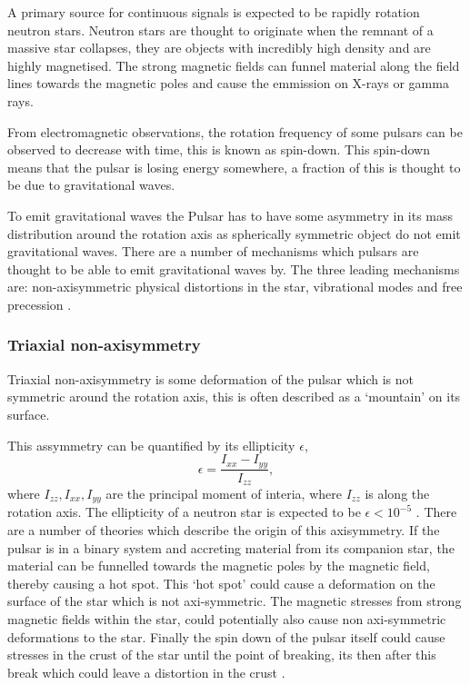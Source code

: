 A primary source for continuous signals is expected to be rapidly rotation neutron stars.
Neutron stars are thought to originate when the remnant of a massive star collapses, they are objects with incredibly high density and are highly magnetised.
The strong magnetic fields can funnel material along the field lines towards the magnetic poles and cause the emmission on X-rays or gamma rays.


From electromagnetic observations, the rotation frequency of some pulsars can be observed to decrease with time, this is known as spin-down.
This spin-down means that the pulsar is losing energy somewhere, a fraction of this is thought to be due to gravitational waves. 

To emit gravitational waves the Pulsar has to have some asymmetry in its mass distribution around the rotation axis as spherically symmetric object do not emit gravitational waves.
There are a number of mechanisms which pulsars are thought to be able to emit gravitational waves by. The three leading mechanisms are: non-axisymmetric physical distortions in the star, vibrational modes and free precession \citep{Becker2009}.

\subsubsection{Triaxial non-axisymmetry}

Triaxial non-axisymmetry is some deformation of the pulsar which is not symmetric around the rotation axis, this is often described as a `mountain' on its surface.

This assymmetry can be quantified by its ellipticity $\epsilon$,
\begin{equation}
\label{ellipticity}
\epsilon = \frac{I_{xx}-I_{yy}}{I_{zz}},
\end{equation}
where $I_{zz},I_{xx},I_{yy}$ are the principal moment of interia, where $I_{zz}$ is along the rotation axis. 
The ellipticity of a neutron star is expected to be $ \epsilon<10^{-5}$ \citep{Becker2009}. 
There are a number of theories which describe the origin of this axisymmetry.
If the pulsar is in a binary system and accreting material from its companion star, the material can be funnelled towards the magnetic poles by the magnetic field, thereby causing a hot spot.
This `hot spot' could cause a deformation on the surface of the star which is not axi-symmetric. 
The magnetic stresses from strong magnetic fields within the star, could potentially also cause non axi-symmetric deformations to the star.
Finally the spin down of the pulsar itself could cause stresses in the crust of the star until the point of breaking, its then after this break which could leave a distortion in the crust \citep{Becker2009}.


